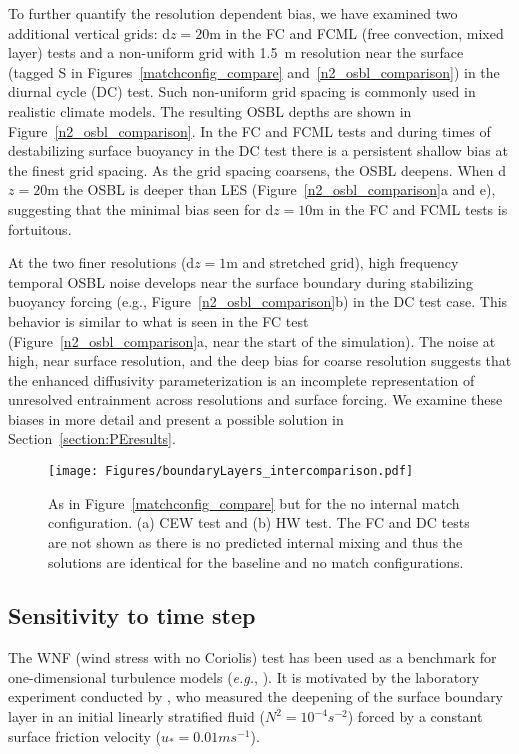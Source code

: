 \documentclass[preprint,12pt,authoryear]{agujournal}
\begin{document}
To further quantify the resolution dependent bias, we have examined two additional vertical grids: d$z = 20$m in the FC and FCML (free convection, mixed layer) tests and a non-uniform grid with 1.5~m resolution near the surface (tagged S in Figures~\ref{matchconfig_compare} and~\ref{n2_osbl_comparison}) in the diurnal cycle (DC) test.  Such non-uniform grid spacing is commonly used in realistic climate models.  The resulting OSBL depths are shown in Figure~\ref{n2_osbl_comparison}.  In the FC and FCML tests and during times of destabilizing surface buoyancy in the DC test there is a persistent shallow bias at the finest grid spacing.  As the grid spacing coarsens, the OSBL deepens.  When d$z = 20$m the OSBL is deeper than LES (Figure~\ref{n2_osbl_comparison}a and e), suggesting that the minimal bias seen for d$z = 10$m in the FC and FCML tests is fortuitous.

At the two finer resolutions (d$z = 1$m and stretched grid), high frequency temporal OSBL noise develops near the surface boundary during stabilizing buoyancy forcing (e.g., Figure~\ref{n2_osbl_comparison}b) in the DC test case.  This behavior is similar to what is seen in the FC test (Figure~\ref{n2_osbl_comparison}a, near the start of the simulation).  The noise at high, near surface resolution, and the deep bias for coarse resolution suggests that the enhanced diffusivity parameterization is an incomplete representation of unresolved entrainment across resolutions and surface forcing.  We examine these biases in more detail and present a possible solution in Section~\ref{section:PEresults}.

\begin{figure}[thbp]
\centering\texttt{[image: Figures/boundaryLayers\_intercomparison.pdf]}
\caption{As in Figure~\ref{matchconfig_compare} but for the no internal match configuration.  (a) CEW test and (b) HW test.  The FC and DC tests are not shown as there is no predicted internal mixing and thus the solutions are identical for the baseline and no match configurations.}
\label{nomatch_coparison}
\end{figure}

\subsection{Sensitivity to time step}
\label{section:timestep}

The WNF (wind stress with no Coriolis) test has been used as a benchmark for one-dimensional turbulence models (\textit{e.g.}, \citealp{burchard2001comparative}).  It is motivated by the laboratory experiment conducted by \cite{kato1969penetration}, who measured the deepening of the surface boundary layer in an initial linearly stratified fluid ($N^2=10^{-4} s^{-2}$) forced by a constant surface friction velocity ($u_* = 0.01 ms^{-1}$).  
\end{document}
